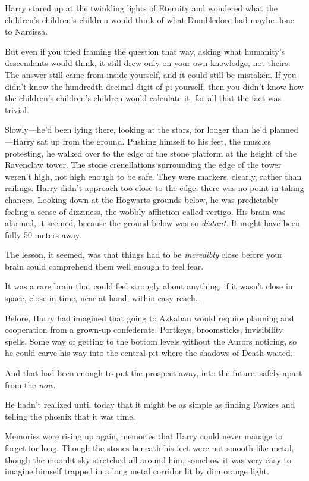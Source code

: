 Harry stared up at the twinkling lights of Eternity and wondered what the children's children's children would think of what Dumbledore had maybe-done to Narcissa.

But even if you tried framing the question that way, asking what humanity's descendants would think, it still drew only on your own knowledge, not theirs. The answer still came from inside yourself, and it could still be mistaken. If you didn't know the hundredth decimal digit of pi yourself, then you didn't know how the children's children's children would calculate it, for all that the fact was trivial.

\later

Slowly---he'd been lying there, looking at the stars, for longer than he'd planned---Harry sat up from the ground. Pushing himself to his feet, the muscles protesting, he walked over to the edge of the stone platform at the height of the Ravenclaw tower. The stone crenellations surrounding the edge of the tower weren't high, not high enough to be safe. They were markers, clearly, rather than railings. Harry didn't approach too close to the edge; there was no point in taking chances. Looking down at the Hogwarts grounds below, he was predictably feeling a sense of dizziness, the wobbly affliction called vertigo. His brain was alarmed, it seemed, because the ground below was so \emph{distant}. It might have been fully 50 meters away.

The lesson, it seemed, was that things had to be \emph{incredibly} close before your brain could comprehend them well enough to feel fear.

It was a rare brain that could feel strongly about anything, if it wasn't close in space, close in time, near at hand, within easy reach{\ldots}

Before, Harry had imagined that going to Azkaban would require planning and cooperation from a grown-up confederate. Portkeys, broomsticks, invisibility spells. Some way of getting to the bottom levels without the Aurors noticing, so he could carve his way into the central pit where the shadows of Death waited.

And that had been enough to put the prospect away, into the future, safely apart from the \emph{now}.

He hadn't realized until today that it might be as simple as finding Fawkes and telling the phœnix that it was time.

Memories were rising up again, memories that Harry could never manage to forget for long. Though the stones beneath his feet were not smooth like metal, though the moonlit sky stretched all around him, somehow it was very easy to imagine himself trapped in a long metal corridor lit by dim orange light.

